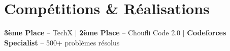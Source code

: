 \documentclass[letterpaper,10.5pt]{article}
\begin{document}
\section{Comp\'etitions \& R\'ealisations}
\vspace{-5pt}
  \begin{itemize}[leftmargin=0.15in, label={}]
    \small{\item{
      \textbf{3\`eme Place} -- TechX \href{https://www.facebook.com/photo/?fbid=499788416027350\&set=pcb.499789566027235\&locale=fr_FR}{\faLink}
      $|$ \textbf{2\`eme Place} -- Choufli Code 2.0 \href{https://www.facebook.com/photo/?fbid=122114273744729719\&set=pcb.122114273900729719\&locale=fr_FR}{\faLink}
      $|$ \textbf{Codeforces Specialist} -- 500+ probl\`emes r\'esolus \href{https://codeforces.com/profile/ROCHDI}{\faLink} \hfill 
    }}
  \end{itemize}
\end{document}
